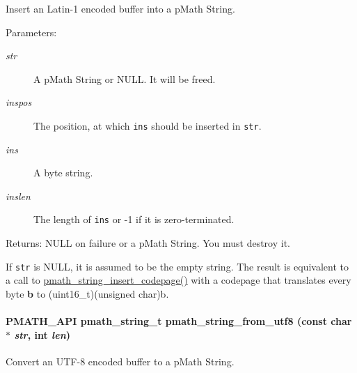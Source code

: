 Insert an Latin-1 encoded buffer into a pMath String. 

\begin{Desc}
\item[Parameters:]
\begin{description}
\item[{\em str}]A pMath String or NULL. It will be freed. \item[{\em inspos}]The position, at which {\tt ins} should be inserted in {\tt str}. \item[{\em ins}]A byte string. \item[{\em inslen}]The length of {\tt ins} or -1 if it is zero-terminated. \end{description}
\end{Desc}
\begin{Desc}
\item[Returns:]NULL on failure or a pMath String. You must destroy it.\end{Desc}
If {\tt str} is NULL, it is assumed to be the empty string. The result is equivalent to a call to \hyperlink{group__strings_g5008b0b2e682b283772e10bf38666ffe}{pmath\_\-string\_\-insert\_\-codepage()} with a codepage that translates every byte {\bf b} to {\bf }(uint16\_\-t)(unsigned char)b. \hypertarget{group__strings_g0591f864ff17f7c27dc7b5032dab7551}{
\paragraph[{pmath\_\-string\_\-from\_\-utf8}]{\setlength{\rightskip}{0pt plus 5cm}PMATH\_\-API {\bf pmath\_\-string\_\-t} pmath\_\-string\_\-from\_\-utf8 (const char $\ast$ {\em str}, \/  int {\em len})}\hfill}
\label{group__strings_g0591f864ff17f7c27dc7b5032dab7551}


Convert an UTF-8 encoded buffer to a pMath String. 


